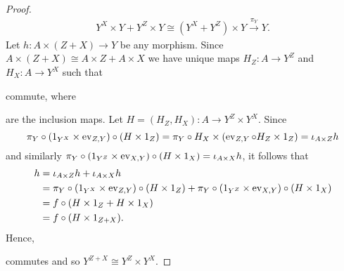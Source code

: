 \begin{solution}
\begin{exercises}
\begin{proof}
\begin{multline*}
            Y^X\times Y+Y^Z\times Y\cong (Y^X+Y^Z)\times Y\xrightarrow{\pi_Y} Y.
        \end{multline*}
        Let $h\colon A\times(Z+X)\to Y$ be any morphism. 
        Since $A\times (Z+X)\cong A\times Z+A\times X$ we have unique maps $H_Z\colon A\to Y^Z$ and $H_X\colon A\to Y^X$ such that 
        \begin{center}
        \end{center}
        commute, where 
        are the inclusion maps. 
        Let $H=(H_{Z},H_{X})\colon A\to Y^Z\times Y^X$. Since
        \[ \pi_Y\circ (1_{Y^X}\times\operatorname{ev}_{Z,Y})\circ (H\times 1_Z)=\pi_Y\circ H_X\times(\operatorname{ev}_{Z, Y}\circ H_Z\times 1_Z)=\iota_{A\times Z}h \]
        and similarly $\pi_Y\circ (1_{Y^Z}\times\operatorname{ev}_{X,Y})\circ (H\times 1_X)=\iota_{A\times X} h$, it follows that
        \begin{align*}
            h&=\iota_{A\times Z}h+\iota_{A\times X}h\\
            &= \pi_Y\circ (1_{Y^X}\times\operatorname{ev}_{Z,Y})\circ (H\times 1_Z)+\pi_Y\circ (1_{Y^Z}\times\operatorname{ev}_{X,Y})\circ (H\times 1_X)\\
            &=f\circ (H\times 1_Z+H\times 1_X)\\
            &=f\circ (H\times 1_{Z+X}).
        \end{align*}
        Hence,
        commutes and so $Y^{Z+X}\cong Y^Z\times Y^X$.
    \end{proof}
   \end{exercises}
\end{solution}

